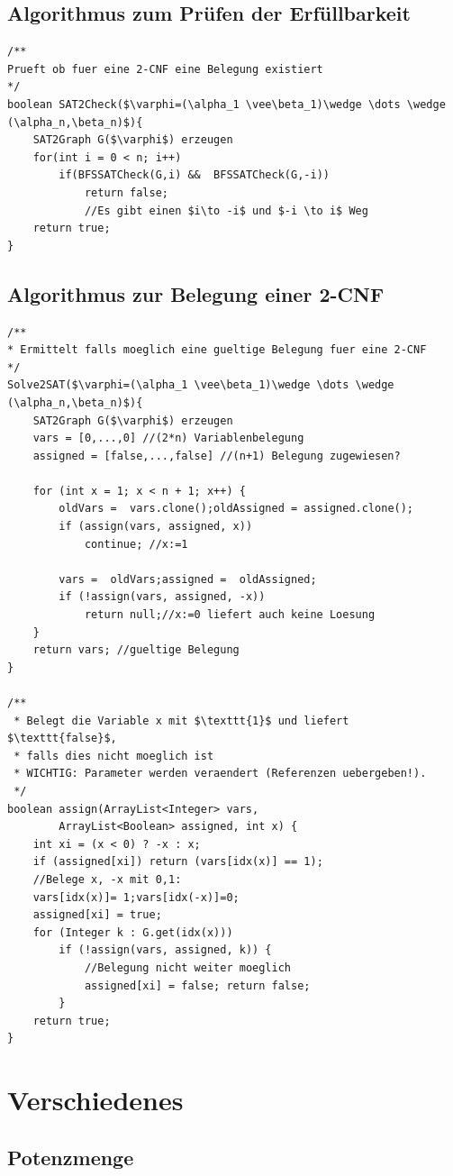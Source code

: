 \documentclass[10pt,a4paper,ngerman,oneside,]{article}
\begin{document}
\begin{multicols}{2}
\subsection{Algorithmus zum Prüfen der Erfüllbarkeit}
\begin{lstlisting}[]
/** 
Prueft ob fuer eine 2-CNF eine Belegung existiert 
*/
boolean SAT2Check($\varphi=(\alpha_1 \vee\beta_1)\wedge \dots \wedge (\alpha_n,\beta_n)$){
	SAT2Graph G($\varphi$) erzeugen
	for(int i = 0 < n; i++)
		if(BFSSATCheck(G,i) &&	BFSSATCheck(G,-i))	
			return false; 
			//Es gibt einen $i\to -i$ und $-i \to i$ Weg
	return true;
}

\end{lstlisting}
\subsection{Algorithmus zur Belegung einer 2-CNF}
\begin{lstlisting}
/**
* Ermittelt falls moeglich eine gueltige Belegung fuer eine 2-CNF
*/
Solve2SAT($\varphi=(\alpha_1 \vee\beta_1)\wedge \dots \wedge (\alpha_n,\beta_n)$){
	SAT2Graph G($\varphi$) erzeugen
	vars = [0,...,0] //(2*n) Variablenbelegung
	assigned = [false,...,false] //(n+1) Belegung zugewiesen?

	for (int x = 1; x < n + 1; x++) {
		oldVars =  vars.clone();oldAssigned = assigned.clone();
		if (assign(vars, assigned, x)) 	
			continue; //x:=1
		
		vars =  oldVars;assigned =  oldAssigned;
		if (!assign(vars, assigned, -x)) 
			return null;//x:=0 liefert auch keine Loesung
	}
	return vars; //gueltige Belegung
}

/**
 * Belegt die Variable x mit $\texttt{1}$ und liefert $\texttt{false}$, 
 * falls dies nicht moeglich ist
 * WICHTIG: Parameter werden veraendert (Referenzen uebergeben!). 
 */
boolean assign(ArrayList<Integer> vars,
		ArrayList<Boolean> assigned, int x) {
	int xi = (x < 0) ? -x : x;
	if (assigned[xi]) return (vars[idx(x)] == 1);
	//Belege x, -x mit 0,1:
	vars[idx(x)]= 1;vars[idx(-x)]=0;
	assigned[xi] = true;
	for (Integer k : G.get(idx(x))) 
		if (!assign(vars, assigned, k)) {
			//Belegung nicht weiter moeglich
			assigned[xi] = false; return false; 
		}
	return true;
}
\end{lstlisting}
\section{Verschiedenes}
\subsection{Potenzmenge}


\end{multicols}
\end{document}
